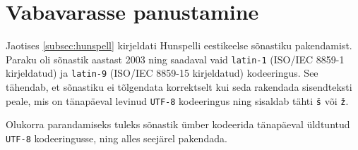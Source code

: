 \section{Vabavarasse panustamine}

Jaotises \ref{subsec:hunspell} kirjeldati Hunspelli eestikeelse sõnastiku pakendamist. Paraku oli sõnastik aastast 2003 ning saadaval vaid \texttt{latin-1} (ISO/IEC 8859-1 kirjeldatud) ja \texttt{latin-9} (ISO/IEC 8859-15 kirjeldatud) kodeeringus. See tähendab, et sõnastiku ei tõlgendata korrektselt kui seda rakendada sisendteksti peale, mis on tänapäeval levinud \texttt{UTF-8} kodeeringus ning sisaldab tähti \texttt{š} või \texttt{ž}.

Olukorra parandamiseks tuleks sõnastik ümber kodeerida tänapäeval üldtuntud \texttt{UTF-8} kodeeringusse, ning alles seejärel pakendada.

